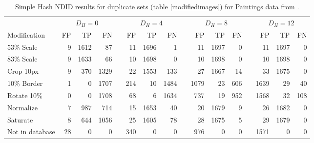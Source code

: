 \documentclass[english,12pt,a4paper,pdftex,elec,utf8, table]{aaltothesis}
\begin{document}
\begin{table}[htb]\footnotesize
\caption{ Simple Hash NDID results for duplicate sets (table \ref{modifiedimages}) for Paintings data from \cite{Vedaldi2012}. }
\label{simpleresults}
\begin{center}
  \setlength\tabcolsep{3pt} %
  \begin{tabular}{@{}lrrrrrrrrrrrrrrr@{}}
    \toprule
    & \multicolumn{3}{c}{$D_H = 0$} &\phantom{abc} &\multicolumn{3}{c}{$D_H = 4$} &\phantom{abc} & \multicolumn{3}{c}{$D_H=8$} &\phantom{abc} & \multicolumn{3}{c}{$D_H=12$}\\
\cmidrule{2-4} \cmidrule{6-8} \cmidrule{10-12} \cmidrule{14-16}
    Modification & FP & TP & FN &\phantom{abc} & FP & TP & FN &\phantom{abc} & FP & TP & FN &\phantom{abc} & FP & TP & FN\\ \midrule
    53\% Scale   & 9 & 1612 & 87 &\phantom{abc} & 11 & 1696 & 1 &\phantom{abc} & 11 & 1697 & 0 &\phantom{abc} & 11 & 1697 & 0\\
    83\% Scale   & 9 & 1633 & 66 &\phantom{abc} & 10 & 1698 & 0 &\phantom{abc} & 10 & 1698 & 0 &\phantom{abc} & 10 & 1698 & 0\\
    Crop 10px    & 9 & 370 & 1329 &\phantom{abc} & 22 & 1553 & 133 &\phantom{abc} & 27 & 1667 & 14 &\phantom{abc} & 33 & 1675 & 0\\
    10\% Border  & 1 & 0 & 1707 & \phantom{abc} & 214 & 10 & 1484 &\phantom{abc} & 1079 & 23 & 606 &\phantom{abc} & 1639 & 29 & 40\\
    Rotate 10\%  & 0 & 0 & 1708 &\phantom{abc} & 68 & 6 & 1634 &\phantom{abc} & 737 & 19 & 952 &\phantom{abc} & 1568 & 32 & 108\\
    Normalize    & 7 & 987 & 714 &\phantom{abc} & 15 & 1653 & 40 &\phantom{abc} & 20 & 1679 & 9 &\phantom{abc} & 26 & 1682 & 0\\
    Saturate     & 8 & 644 & 1056 &\phantom{abc} & 25 & 1605 & 78 &\phantom{abc} & 28 & 1675 & 5 &\phantom{abc} & 29 & 1679 & 0\\
    Not in database     & 28 & 0 & 0 &\phantom{abc} & 340 & 0 & 0 &\phantom{abc} & 976 & 0 & 0 &\phantom{abc} & 1571& 0& 0\\

    \bottomrule
\end{tabular}
\end{center}
\end{table}
\end{document}
